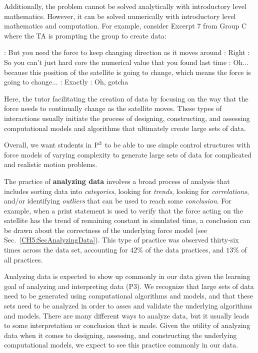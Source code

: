 \documentclass{msuphddissertation}
\begin{document}
\begin{doublespace}
Additionally, the problem cannot be solved analytically with introductory level mathematics.  However, it can be solved numerically with introductory level mathematics and computation.  For example, consider Excerpt 7 from Group C where the TA is prompting the group to create data: \begin{description}
\TA: But you need the force to keep changing direction as it moves around
\SC: Right
\TA: So you can't just hard core the numerical value that you found last time
\SC: Oh... because this {position of the satellite} is going to change, which means the force is going to change...
\TA: Exactly
\SB: Oh, gotcha
\end{description}  Here, the tutor facilitating the creation of data by focusing on the way that the force needs to continually change as the satellite moves.  These types of interactions usually initiate the process of designing, constructing, and assessing computational models and algorithms that ultimately create large sets of data.

Overall, we want students in ${\rm P}^{3}$ to be able to use simple control structures with force models of varying complexity to generate large sets of data for complicated and realistic motion problems.

The practice of \textbf{analyzing data} involves a broad process of analysis that includes sorting data into \textit{categories}, looking for \textit{trends}, looking for \textit{correlations}, and/or identifying \textit{outliers} that can be used to reach some \textit{conclusion}.  For example, when a print statement is used to verify that the force acting on the satellite has the trend of remaining constant in simulated time, a conclusion can be drawn about the correctness of the underlying force model (see Sec.~\ref{CH5:SecAnalyzingData}).  This type of practice was observed thirty-six times across the data set, accounting for $42\%$ of the data practices, and $13\%$ of all practices.

Analyzing data is expected to show up commonly in our data given the learning goal of analyzing and interpreting data (P3).  We recognize that large sets of data need to be generated using computational algorithms and models, and that these sets need to be analyzed in order to asses and validate the underlying algorithms and models.  There are many different ways to analyze data, but it usually leads to some interpretation or conclusion that is made.  Given the utility of analyzing data when it comes to designing, assessing, and constructing the underlying computational models, we expect to see this practice commonly in our data.


\end{doublespace}
\end{document}
